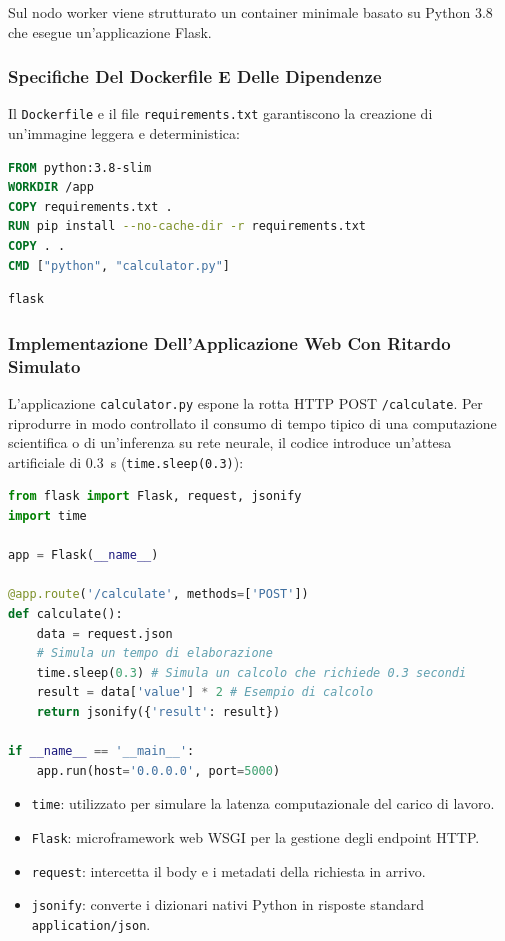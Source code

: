 \documentclass[11pt, a4paper]{article}
\begin{document}
Sul nodo worker viene strutturato un container minimale basato su Python 3.8 che esegue un'applicazione Flask.

\subsubsection{Specifiche Del Dockerfile E Delle Dipendenze}

Il \texttt{Dockerfile} e il file \texttt{requirements.txt} garantiscono la creazione di un'immagine leggera e deterministica:

\begin{lstlisting}[language=dockerfile]
FROM python:3.8-slim
WORKDIR /app
COPY requirements.txt .
RUN pip install --no-cache-dir -r requirements.txt
COPY . .
CMD ["python", "calculator.py"]
\end{lstlisting}

\begin{lstlisting}
flask
\end{lstlisting}

\subsubsection{Implementazione Dell'Applicazione Web Con Ritardo Simulato}

L'applicazione \texttt{calculator.py} espone la rotta HTTP POST \texttt{/calculate}. Per riprodurre in modo controllato il consumo di tempo tipico di una computazione scientifica o di un'inferenza su rete neurale, il codice introduce un'attesa artificiale di \SI{0.3}{\second} (\texttt{time.sleep(0.3)}):

\begin{lstlisting}[language=Python]
from flask import Flask, request, jsonify
import time

app = Flask(__name__)

@app.route('/calculate', methods=['POST'])
def calculate():
    data = request.json
    # Simula un tempo di elaborazione
    time.sleep(0.3) # Simula un calcolo che richiede 0.3 secondi
    result = data['value'] * 2 # Esempio di calcolo
    return jsonify({'result': result})

if __name__ == '__main__':
    app.run(host='0.0.0.0', port=5000)
\end{lstlisting}

\begin{itemize}[noitemsep]
    \item \texttt{time}: utilizzato per simulare la latenza computazionale del carico di lavoro.
    \item \texttt{Flask}: microframework web WSGI per la gestione degli endpoint HTTP.
    \item \texttt{request}: intercetta il body e i metadati della richiesta in arrivo.
    \item \texttt{jsonify}: converte i dizionari nativi Python in risposte standard \texttt{application/json}.
\end{itemize}
\end{document}
